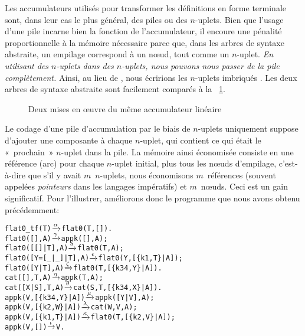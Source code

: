 Les accumulateurs utilisés pour transformer les définitions en forme
terminale sont, dans leur cas le plus général, des piles ou des
\(n\)-uplets. Bien que l'usage d'une pile incarne bien la fonction de
l'accumulateur, il encoure une pénalité proportionnelle à la mémoire
nécessaire parce que, dans les arbres de syntaxe abstraite, un
empilage correspond à un n{\oe}ud, tout comme un \(n\)-uplet. \emph{En
  utilisant des \(n\)-uplets dans des \(n\)-uplets, nous pouvons nous
  passer de la pile complètement.} Ainsi, au lieu de
\erlcode{[\{k3,\(X_1\)\},\{k1,\(V\),\(E\)\},\{k3,\(X_2\)\}]}, nous
écririons les \(n\)-uplets imbriqués
. Les
deux arbres de syntaxe abstraite sont facilement comparés à la
\fig~\ref{fig:tuple_vs_stack}.
\begin{figure}
\centering
{}
\caption{Deux mises en {\oe}uvre du même accumulateur linéaire
\label{fig:tuple_vs_stack}}
\end{figure}
Le codage d'une pile d'accumulation par le biais de \(n\)-uplets
uniquement suppose d'ajouter une composante à chaque \(n\)-uplet, qui
contient ce qui était le «~prochain~» \(n\)-uplet dans la pile. La
mémoire ainsi économisée consiste en une référence (arc) pour chaque
\(n\)-uplet initial, plus tous les n{\oe}uds d'empilage, c'est-à-dire
que s'il y avait \(m\)~\(n\)-uplets, nous économisons \(m\)~références
(souvent appelées \emph{pointeurs} dans les langages impératifs) et
\(m\)~n{\oe}uds. Ceci est un gain significatif. Pour l'illustrer,
améliorons donc le programme que nous avons obtenu précédemment:
\begin{alltt}
flat0\_tf(T)          \(\smashedrightarrow{\alpha}\) flat0(T,[]).
flat0(         [],A) \(\smashedrightarrow{\gamma}\) appk([],A);
flat0(     [[]|T],A) \(\smashedrightarrow{\delta}\) flat0(T,A);
flat0([Y=[\_|\_]|T],A) \(\smashedrightarrow{\epsilon}\) flat0(Y,[\{k1,T\}|A]);
flat0(    [Y|T],A)   \(\smashedrightarrow{\zeta}\) flat0(T,[\{k34,Y\}|A]).
cat(   [],T,A)       \(\smashedrightarrow{\eta}\) appk(T,A);
cat([X|S],T,A)       \(\smashedrightarrow{\theta}\) cat(S,T,[\{k34,X\}|A]).
appk(V,[\{k34,Y\}|A])  \(\smashedrightarrow{\mu}\) appk([Y|V],A);
appk(V, [\{k2,W\}|A])  \(\smashedrightarrow{\lambda}\) cat(W,V,A);
appk(V, [\{k1,T\}|A])  \(\smashedrightarrow{\kappa}\) flat0(T,[\{k2,V\}|A]);
appk(V,         [])  \(\smashedrightarrow{\iota}\) V.
\end{alltt}
